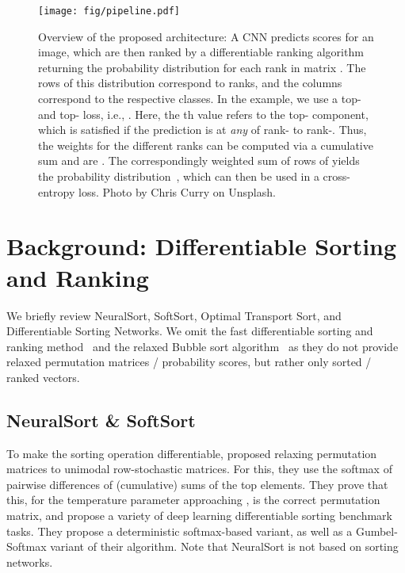 \documentclass{article}
\newcommand{\revA}[1]{{#1}}
\newcommand{\revD}[1]{{#1}}
\begin{document}
\begin{figure*}[h]
    \centering
    \texttt{[image: fig/pipeline.pdf]}
    \caption{
        Overview of the proposed architecture:
        A CNN predicts scores for an image, which are then ranked by a differentiable ranking algorithm returning the probability distribution for each rank in matrix .
        The rows of this distribution correspond to ranks, and the columns correspond to the respective classes.
        In the example, we use a  top- and  top- loss\revA{, i.e., . Here, the th value refers to the top- component, which is satisfied if the prediction is at \textit{any} of \hbox{rank-} to rank-.
        Thus, the weights for the different ranks can be computed via a cumulative sum and are .}
        The correspondingly weighted sum of rows of  yields the probability distribution~, which can then be used in a cross-entropy loss.  
        Photo by Chris Curry on Unsplash.
    }
    \label{fig:panda-overview}
\end{figure*}

\section[Background: Differentiable Sorting and Ranking]{Background: Differentiable Sorting and Ranking}

\label{sec:background-diff-sort-and-rank}

We briefly review NeuralSort, SoftSort, Optimal Transport Sort, and Differentiable Sorting Networks.
We omit the fast differentiable sorting and ranking method~\citep{Blondel2020-FastSorting} and the relaxed Bubble sort algorithm~\cite{petersen2021learning} as they do not provide relaxed permutation matrices / probability scores, but rather only sorted / ranked vectors.

\subsection{NeuralSort \& SoftSort}
\vspace*{-.25em}
To make the sorting operation differentiable, \citet{Grover2019-NeuralSort} proposed relaxing permutation matrices to unimodal row-stochastic matrices. 
For this, they use the softmax of pairwise differences of (cumulative) sums of the top elements.
They prove that this, for the temperature parameter approaching , is the correct permutation matrix, and propose a variety of deep learning differentiable sorting benchmark tasks.
They propose a deterministic softmax-based variant, as well as a Gumbel-Softmax variant of their algorithm. 
\revD{Note that NeuralSort is not based on sorting networks.}
\end{document}

